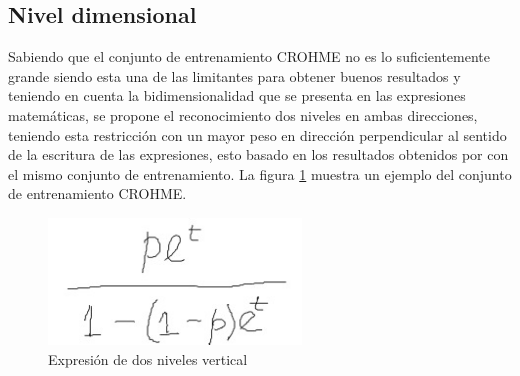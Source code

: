 \newpage
\subsection{Nivel dimensional}
Sabiendo que el conjunto de entrenamiento CROHME no es lo suficientemente grande siendo esta una de las limitantes para obtener buenos resultados y teniendo en cuenta la bidimensionalidad que se presenta en las expresiones matemáticas, se propone el reconocimiento dos niveles en ambas direcciones, teniendo esta restricción con un mayor peso en dirección perpendicular al sentido de la escritura de las expresiones, esto basado en los resultados obtenidos por \cite{chino} 
con el mismo conjunto de entrenamiento. La figura \ref{fig:TwoDimensions} muestra un ejemplo del conjunto de entrenamiento CROHME.
\begin{figure}[H]
	\centering
	\includegraphics[width=0.6\textwidth]{capitulo3/imgs/twolevel.jpeg}
	\caption{Expresión de dos niveles vertical}
	\label{fig:TwoDimensions}
\end{figure}